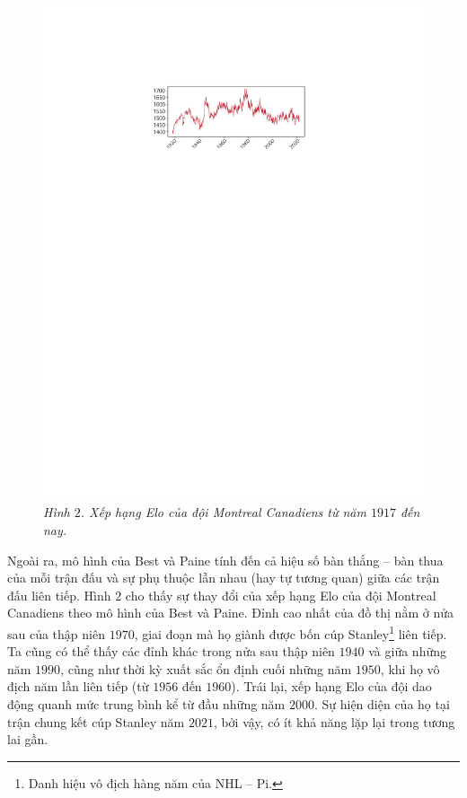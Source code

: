 \begin{multicols}{2}
\begin{figure}[H]
		\includegraphics[width= 1\linewidth]{pic3}
		\caption{\small\textit{\color{toanhocdoisong}Hình $2$. Xếp hạng Elo của đội Montreal Canadiens từ năm $1917$ đến nay.}}
		\vspace*{-10pt}
	\end{figure}
	Ngoài ra, mô hình của Best và Paine tính đến cả hiệu số bàn thắng -- bàn thua của mỗi trận đấu và sự phụ thuộc lẫn nhau (hay tự tương quan) giữa các trận đấu liên tiếp.
	\vskip 0.05cm
	Hình $2$ cho thấy sự thay đổi của xếp hạng Elo của đội Montreal Canadiens theo mô hình của Best và Paine. Đỉnh cao nhất của đồ thị nằm ở nửa sau của thập niên $1970$, giai đoạn mà họ giành được bốn cúp Stanley\footnote[5]{\color{toanhocdoisong}Danh hiệu vô địch hàng năm của NHL -- Pi.}  liên tiếp.
	\vskip 0.05cm
	Ta cũng có thể thấy các đỉnh khác trong nửa sau thập niên $1940$ và giữa những năm $1990$, cũng như thời kỳ xuất sắc ổn định cuối những năm $1950$, khi họ vô địch năm lần liên tiếp (từ $1956$ đến $1960$). Trái lại, xếp hạng Elo của đội dao động quanh mức trung bình kể từ đầu những năm $2000$. Sự hiện diện của họ tại trận chung kết cúp Stanley năm $2021$, bởi vậy, có ít khả năng lặp lại trong tương lai gần.

\end{multicols}
